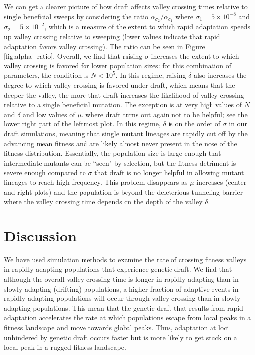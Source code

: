 \documentclass[10pt,twocolumn,twoside]{gsajnl}
\begin{document}
\begin{spacing}{1.5}
We can get a clearer picture of how draft affects valley crossing times relative to single beneficial sweeps by considering the ratio $\alpha_{\sigma_2} / \alpha_{\sigma_1}$ where $\sigma_1=5 \times 10^{-8}$ and $\sigma_2=5 \times 10^{-2}$, which is a measure of the extent to which rapid adaptation speeds up valley crossing relative to sweeping (lower values indicate that rapid adaptation favors valley crossing).
The ratio can be seen in Figure \ref{fig:alpha_ratio}.
Overall, we find that raising $\sigma$ increases the extent to which valley crossing is favored for lower population sizes: for this combination of parameters, the condition is $N < 10^{5}$.
In this regime, raising $\delta$ also increases the degree to which valley crossing is favored under draft, which means that the deeper the valley, the more that draft increases the likelihood of valley crossing relative to a single beneficial mutation.
The exception is at very high values of $N$ and $\delta$ and low values of $\mu$, where draft turns out again not to be helpful; see the lower right part of the leftmost plot.
In this regime, $\delta$ is on the order of $\sigma$ in our draft simulations, meaning that single mutant lineages are rapidly cut off by the advancing mean fitness and are likely almost never present in the nose of the fitness distribution.
Essentially, the population size is large enough that intermediate mutants can be ``seen" by selection, but the fitness detriment is severe enough compared to $\sigma$ that draft is no longer helpful in allowing mutant lineages to reach high frequency.
This problem disappears as $\mu$ increases (center and right plots) and the population is beyond the deleterious tunneling barrier where the valley crossing time depends on the depth of the valley $\delta$.

\section{Discussion}

We have used simulation methods to examine the rate of crossing fitness valleys in rapidly adapting populations that experience genetic draft.
We find that although the overall valley crossing time is longer in rapidly adapting than in slowly adapting (drifting) populations, a higher fraction of adaptive events in rapidly adapting populations will occur through valley crossing than in slowly adapting populations.
This mean that the genetic draft that results from rapid adaptation accelerates the rate at which populations escape from local peaks in a fitness landscape and move towards global peaks.
Thus, adaptation at loci unhindered by genetic draft occurs faster but is more likely to get stuck on a local peak in a rugged fitness landscape.


\end{spacing}
\end{document}
